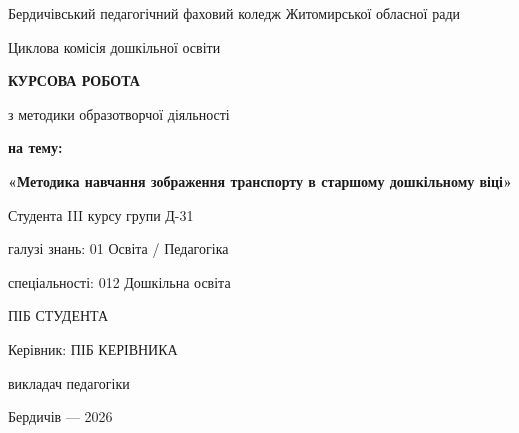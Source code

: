 \documentclass[14pt,a4paper]{extreport}
\begin{document}

\thispagestyle{empty}

\begin{center}
Бердичівський педагогічний фаховий коледж Житомирської обласної ради
\end{center}

\vspace{10pt}

\begin{center}
Циклова комісія дошкільної освіти
\end{center}

\vspace{20pt}

\begin{center}
\textbf{КУРСОВА РОБОТА}
\end{center}

\begin{center}
з методики образотворчої діяльності
\end{center}

\vspace{10pt}

\begin{center}
\textbf{на тему:}

\textbf{«Методика навчання зображення транспорту  
в старшому дошкільному віці»}
\end{center}

\vspace{40pt}

Студента III курсу групи Д-31  

галузі знань: 01 Освіта / Педагогіка  

спеціальності: 012 Дошкільна освіта  

ПІБ СТУДЕНТА

\vspace{15pt}

Керівник: ПІБ КЕРІВНИКА  

викладач педагогіки

\vfill

\begin{center}
Бердичів — 2026
\end{center}

\newpage

\end{document}
